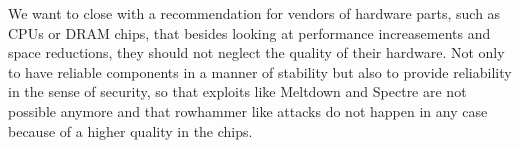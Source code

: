 We want to close with a recommendation for vendors of hardware parts, such as
CPUs or DRAM chips, that besides looking at performance increasements and space
reductions, they should not neglect the quality of their hardware. Not only to
have reliable components in a manner of stability but also to provide
reliability in the sense of security, so that exploits like Meltdown and Spectre
are not possible anymore and that rowhammer like attacks do not happen in any
case because of a higher quality in the chips.

